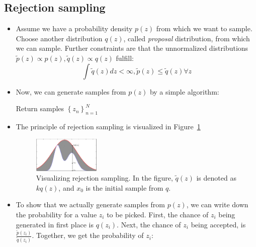 \subsection{Rejection sampling}
\begin{itemize}
	\item Assume we have a probability density $p(z)$ from which we want to sample. Choose another distribution $q(z)$, called \textit{proposal} distribution, from which we can sample. Further constraints are that the unnormalized distributions $\tilde{p}(z)\propto p(z), \tilde{q}(z)\propto q(z)$ fulfill:
	$$\int \tilde{q}(z)dz < \infty, \tilde{p}(z)\leq \tilde{q}(z) \forall z$$
	\item Now, we can generate samples from $p(z)$ by a simple algorithm:
	\begin{tcolorbox}[colback=white!80!gray,colframe=gray!75!black,title=Pseudocode for rejection sampling]
		\begin{algorithm}[H]
			\SetAlgoLined
			Return samples $\left\{z_n\right\}_{n=1}^{N}$\;
		\end{algorithm}
	\end{tcolorbox}
	\item The principle of rejection sampling is visualized in Figure~\ref{fig:sampling_rejection_sampling}
	\begin{figure}[ht!]
		\centering
		\includegraphics[width=0.3\textwidth]{figures/sampling_rejection_sampling.png}
		\caption{Visualizing rejection sampling. In the figure, $\tilde{q}(z)$ is denoted as $kq(z)$, and $x_0$ is the initial sample from $q$.}
		\label{fig:sampling_rejection_sampling}
	\end{figure}
	\item To show that we actually generate samples from $p(z)$, we can write down the probability for a value $z_i$ to be picked. First, the chance of $z_i$ being generated in first place is $q(z_i)$. Next, the chance of $z_i$ being accepted, is $\frac{\tilde{p}(z_i)}{\tilde{q}(z_i)}$. Together, we get the probability of $z_i$:

\end{itemize}
